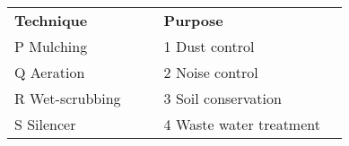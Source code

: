 \begin{tabular}{llcll}
\textbf{Technique} & & & \textbf{Purpose} \\[6pt]
P \; Mulching        & & & 1 \; Dust control \\
Q \; Aeration        & & & 2 \; Noise control \\
R \; Wet-scrubbing   & & & 3 \; Soil conservation \\
S \; Silencer        & & & 4 \; Waste water treatment \\
\end{tabular}